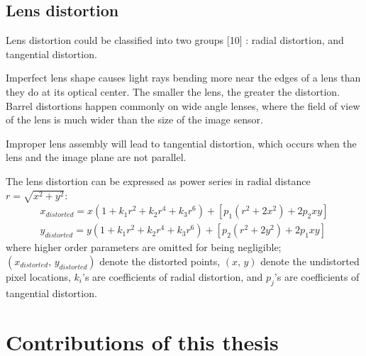 \subsection{Lens distortion}
Lens distortion could be classified into two groups [10] : radial distortion, and tangential distortion.\par
%
Imperfect lens shape causes light rays bending more near the edges of a lens than they do at its optical center. The smaller the lens, the greater the distortion. Barrel distortions happen commonly on wide angle lenses, where the field of view of the lens is much wider than the size of the image sensor.\par%
Improper lens assembly will lead to tangential distortion, which occurs when the lens and the image plane are not parallel.\\\par
%
The lens distortion can be expressed as power series in radial distance \(r = \sqrt{x^2 + y^2}\):
\begin{equation}
%
\begin{aligned}
x_{distorted} =  x (1 + k_1 r^2 + k_2 r^4 + k_3 r^6) + [p_1 (r^2 + 2 x^2) + 2 p_2 xy] %
\\%
y_{distorted} =  y (1 + k_1 r^2 + k_2 r^4 + k_3 r^6) + [p_2 (r^2 + 2 y^2) + 2 p_1 xy]
\end{aligned}
\label{lensDistortion}
%
\end{equation}%
%
where higher order parameters are omitted for being negligible; \((x_{distorted}, \, y_{distorted})\) denote the distorted points, \((x, \, y)\) denote the undistorted pixel locations, \(k_i\)'s are coefficients of radial distortion, and \(p_j\)'s are coefficients of tangential distortion.\par
%
\section{Contributions of this thesis}

